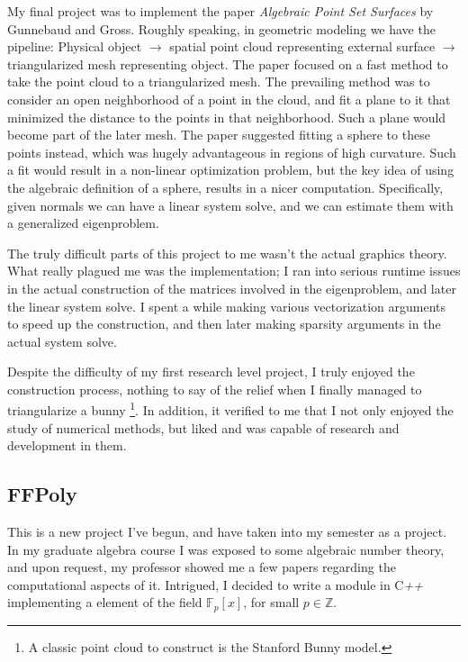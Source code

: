 \documentclass[12pt]{article}
\begin{document}
My final project was to implement the paper \textit{Algebraic Point Set
Surfaces} by Gunnebaud and Gross. Roughly speaking, in geometric modeling we
have the pipeline: Physical object $\to$ spatial point cloud representing
external surface $\to$ triangularized mesh representing object. The paper
focused on a fast method to take the point cloud to a triangularized mesh. The
prevailing method was to consider an open neighborhood of a point in the cloud,
and fit a plane to it that minimized the distance to the points in that
neighborhood. Such a plane would become part of the later mesh. The paper
suggested fitting a sphere to these points instead, which was hugely
advantageous in regions of high curvature. Such a fit would result in a
non-linear optimization problem, but the key idea of using the algebraic
definition of a sphere, results in a nicer computation. Specifically, given
normals we can have a linear system solve, and we can estimate them with a
generalized eigenproblem.

The truly difficult parts of this project to me wasn't the actual graphics
theory. What really plagued me was the implementation; I ran into serious
runtime issues in the actual construction of the matrices involved in the
eigenproblem, and later the linear system solve. I spent a while making various
vectorization arguments to speed up the construction, and then later making
sparsity arguments in the actual system solve. 

Despite the difficulty of my first research level project, I truly enjoyed the
construction process, nothing to say of the relief when I finally managed to
triangularize a bunny \footnote{A classic point cloud to construct is the
Stanford Bunny model.}. In addition, it verified to me that I not only enjoyed
the study of numerical methods, but liked and was capable of research and
development in them.

\subsection{FFPoly}

This is a new project I've begun, and have taken into my semester as a project.
In my graduate algebra course I was exposed to some algebraic number theory, and
upon request, my professor showed me a few papers regarding the computational
aspects of it. Intrigued, I decided to write a module in C\textit{++}
implementing a element of the field $\mathbb{F}_p[x]$, for small $p \in
\mathbb{Z}$. 
\end{document}
